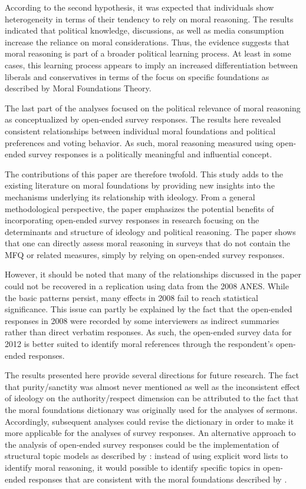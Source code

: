 \documentclass[12pt]{article}
\begin{document}
According to the second hypothesis, it was expected that individuals show heterogeneity in terms of their tendency to rely on moral reasoning. The results indicated that political knowledge, discussions, as well as media consumption increase the reliance on moral considerations. Thus, the evidence suggests that moral reasoning is part of a broader political learning process. At least in some cases, this learning process appears to imply an increased differentiation between liberals and conservatives in terms of the focus on specific foundations as described by Moral Foundations Theory.

The last part of the analyses focused on the political relevance of moral reasoning as conceptualized by open-ended survey responses. The results here revealed consistent relationships between individual moral foundations and political preferences and voting behavior. As such, moral reasoning measured using open-ended survey responses is a politically meaningful and influential concept.

The contributions of this paper are therefore twofold. This study adds to the existing literature on moral foundations by providing new insights into the mechanisms underlying its relationship with ideology. From a general methodological perspective, the paper emphasizes the potential benefits of incorporating open-ended survey responses in research focusing on the determinants and structure of ideology and political reasoning. The paper shows that one can directly assess moral reasoning in surveys that do not contain the MFQ or related measures, simply by relying on open-ended survey responses.

However, it should be noted that many of the relationships discussed in the paper could not be recovered in a replication using data from the 2008 ANES. While the basic patterns persist, many effects in 2008 fail to reach statistical significance. This issue can partly be explained by the fact that the open-ended responses in 2008 were recorded by some interviewers as indirect summaries rather than direct verbatim responses. As such, the open-ended survey data for 2012 is better suited to identify moral references through the respondent's open-ended responses.

The results presented here provide several directions for future research. The fact that purity/sanctity was almost never mentioned as well as the inconsistent effect of ideology on the authority/respect dimension can be attributed to the fact that the moral foundations dictionary was originally used for the analyses of sermons. Accordingly, subsequent analyses could revise the dictionary in order to make it more applicable for the analyses of survey responses. An alternative approach to the analysis of open-ended survey responses could be the implementation of structural topic models as described by \citet{roberts2014structural}: instead of using explicit word lists to identify moral reasoning, it would possible to identify specific topics in open-ended responses that are consistent with the moral foundations described by \citet{haidt2008moral} \citep[see also][]{lin2008joint}.
\end{document}
